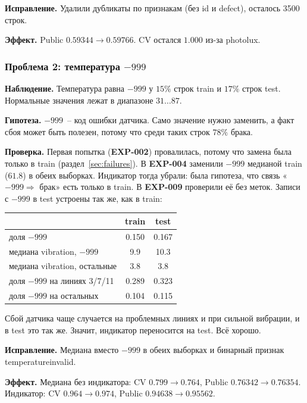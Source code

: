 \documentclass[11pt,a4paper,twocolumn]{article}
\newcommand{\f}[1]{{\ttfamily\def\_{\textunderscore\allowbreak}#1}}
\begin{document}
\textbf{Исправление.} Удалили дубликаты по признакам (без \f{id} и \f{defect}), осталось 3500 строк.

\textbf{Эффект.} Public $0.59344 \to 0.59766$. CV остался $1.000$ из-за \f{photo\_lux}.

\subsubsection{Проблема 2: температура $-999$}
\textbf{Наблюдение.} Температура равна $-999$ у $15\%$ строк \f{train} и $17\%$ строк \f{test}. Нормальные значения лежат в диапазоне $31 \dots 87$.

\textbf{Гипотеза.} $-999$~-- код ошибки датчика. Само значение нужно заменить, а факт сбоя может быть полезен, потому что среди таких строк $78\%$ брака.

\textbf{Проверка.} Первая попытка (\textbf{EXP-002}) провалилась, потому что замена была только в \f{train} (раздел~\ref{sec:failures}). В \textbf{EXP-004} заменили $-999$ медианой \f{train} ($61.8$) в обеих выборках. Индикатор тогда убрали: была гипотеза, что связь «$-999 \Rightarrow$ брак» есть только в \f{train}. В \textbf{EXP-009} проверили её без меток. Записи с $-999$ в \f{test} устроены так же, как в \f{train}:

\begin{center}
\small
\begin{tabular}{lcc}
    \toprule
    & \textbf{train} & \textbf{test} \\
    \midrule
    доля $-999$ & 0.150 & 0.167 \\
    медиана \f{vibration}, $-999$ & 9.9 & 10.3 \\
    медиана \f{vibration}, остальные & 3.8 & 3.8 \\
    доля $-999$ на линиях 3/7/11 & 0.289 & 0.323 \\
    доля $-999$ на остальных & 0.104 & 0.115 \\
    \bottomrule
\end{tabular}
\end{center}

Сбой датчика чаще случается на проблемных линиях и при сильной вибрации, и в \f{test} это так же. Значит, индикатор переносится на \f{test}. Всё хорошо.

\textbf{Исправление.} Медиана вместо $-999$ в обеих выборках и бинарный признак \f{temperature\_invalid}.

\textbf{Эффект.} Медиана без индикатора: CV $0.799 \to 0.764$, Public $0.76342 \to 0.76354$. Индикатор: CV $0.964 \to 0.974$, Public $0.94638 \to 0.95562$.
\end{document}

